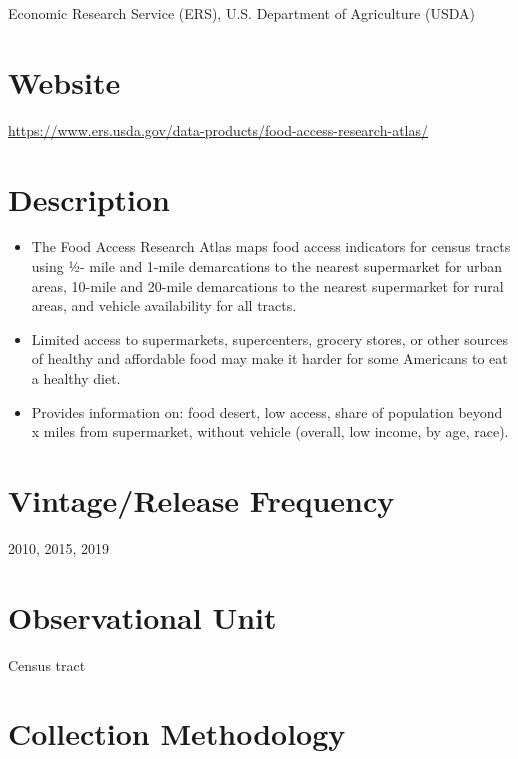 \documentclass[
]{book}
\providecommand{\tightlist}{%
  \setlength{\itemsep}{0pt}\setlength{\parskip}{0pt}}
\begin{document}
Economic Research Service (ERS), U.S. Department of Agriculture (USDA)

\hypertarget{website-26}{%
\section{Website}\label{website-26}}

\url{https://www.ers.usda.gov/data-products/food-access-research-atlas/}

\hypertarget{description-26}{%
\section{Description}\label{description-26}}

\begin{itemize}
\tightlist
\item
  The Food Access Research Atlas maps food access indicators for census tracts using ½- mile and 1-mile demarcations to the nearest supermarket for urban areas, 10-mile and 20-mile demarcations to the nearest supermarket for rural areas, and vehicle availability for all tracts.
\item
  Limited access to supermarkets, supercenters, grocery stores, or other sources of healthy and affordable food may make it harder for some Americans to eat a healthy diet.
\item
  Provides information on: food desert, low access, share of population beyond x miles from supermarket, without vehicle (overall, low income, by age, race).
\end{itemize}

\hypertarget{vintagerelease-frequency-26}{%
\section{Vintage/Release Frequency}\label{vintagerelease-frequency-26}}

2010, 2015, 2019

\hypertarget{observational-unit-26}{%
\section{Observational Unit}\label{observational-unit-26}}

Census tract

\hypertarget{collection-methodology-26}{%
\section{Collection Methodology}\label{collection-methodology-26}}
\end{document}
